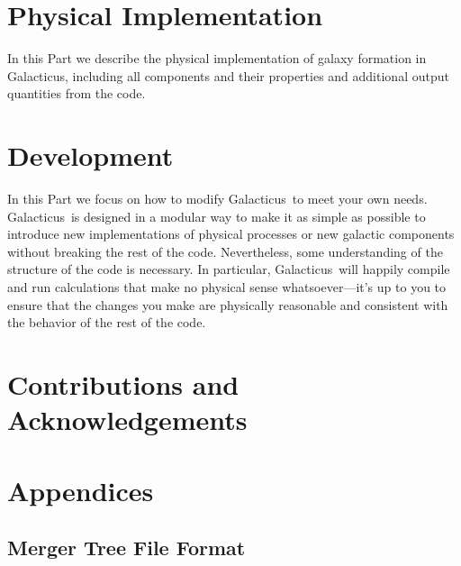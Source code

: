 \documentclass[letterpaper,10pt,headsepline]{scrbook}
\def\glc{{\sc Galacticus}}
\begin{document}


\part{Physical Implementation}

In this Part we describe the physical implementation of galaxy formation in \glc, including all components and their properties and additional output quantities from the code.









\part{Development}

In this Part we focus on how to modify \glc\ to meet your own needs. \glc\ is designed in a modular way to make it as simple as possible to introduce new implementations of physical processes or new galactic components without breaking the rest of the code. Nevertheless, some understanding of the structure of the code is necessary. In particular, \glc\ will happily compile and run calculations that make no physical sense whatsoever---it's up to you to ensure that the changes you make are physically reasonable and consistent with the behavior of the rest of the code.











\part{Contributions and Acknowledgements}





\appendix

\part{Appendices}

\chapter{Merger Tree File Format}\label{sec:MergerTreeFileFormat}
\end{document}

